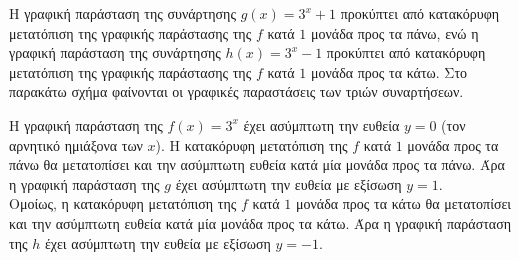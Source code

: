 \begin{alist}
\item Η γραφική παράσταση της συνάρτησης $g(x) = 3^x + 1$ προκύπτει από κατακόρυφη μετατόπιση της γραφικής παράστασης της $f$ κατά $1$ μονάδα προς τα πάνω, ενώ η γραφική παράσταση της συνάρτησης $h(x) = 3^x - 1$ προκύπτει από κατακόρυφη μετατόπιση της γραφικής παράστασης της $f$ κατά $1$ μονάδα προς τα κάτω. Στο παρακάτω σχήμα φαίνονται οι γραφικές παραστάσεις των τριών συναρτήσεων.
\begin{center}
\end{center}
\item Η γραφική παράσταση της $f(x) = 3^x$ έχει ασύμπτωτη την ευθεία $y=0$ (τον αρνητικό ημιάξονα των $x$). Η κατακόρυφη μετατόπιση της $f$ κατά $1$ μονάδα προς τα πάνω θα μετατοπίσει και την ασύμπτωτη ευθεία κατά μία μονάδα προς τα πάνω. Άρα η γραφική παράσταση της $g$ έχει ασύμπτωτη την ευθεία με εξίσωση $y=1$. \\
Ομοίως, η κατακόρυφη μετατόπιση της $f$ κατά $1$ μονάδα προς τα κάτω θα μετατοπίσει και την ασύμπτωτη ευθεία κατά μία μονάδα προς τα κάτω. Άρα η γραφική παράσταση της $h$ έχει ασύμπτωτη την ευθεία με εξίσωση $y=-1$.
\end{alist}

